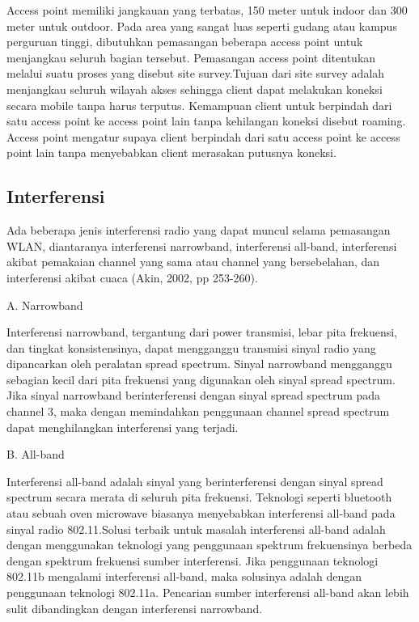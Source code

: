 \documentclass{jtetiproposalskripsi}
\begin{document}
	Access point memiliki jangkauan yang terbatas, 150 meter untuk indoor dan 300 meter untuk outdoor. Pada area yang sangat luas seperti gudang atau kampus perguruan tinggi, dibutuhkan pemasangan beberapa access point untuk menjangkau seluruh bagian tersebut. Pemasangan access point ditentukan melalui suatu proses yang disebut site survey.Tujuan dari site survey adalah menjangkau seluruh wilayah akses sehingga client dapat melakukan koneksi secara mobile tanpa harus terputus. Kemampuan client untuk berpindah dari satu access point ke access point lain tanpa kehilangan koneksi disebut roaming. Access point mengatur supaya client berpindah dari satu access point ke access point lain tanpa menyebabkan client merasakan putusnya koneksi.

\subsection{Interferensi}

	Ada beberapa jenis interferensi radio yang dapat muncul selama pemasangan WLAN, diantaranya interferensi narrowband, interferensi all-band, interferensi akibat pemakaian channel yang sama atau channel yang bersebelahan, dan interferensi akibat cuaca (Akin, 2002, pp 253-260).

A. Narrowband

	Interferensi narrowband, tergantung dari power transmisi, lebar pita frekuensi, dan tingkat konsistensinya, dapat mengganggu transmisi sinyal radio yang dipancarkan oleh peralatan spread spectrum. Sinyal narrowband mengganggu sebagian kecil dari pita frekuensi yang digunakan oleh sinyal spread spectrum. Jika sinyal narrowband berinterferensi dengan sinyal spread spectrum pada channel 3, maka dengan memindahkan penggunaan channel spread spectrum dapat menghilangkan interferensi yang terjadi. 

B. All-band

	Interferensi all-band adalah sinyal yang berinterferensi dengan sinyal spread spectrum secara merata di seluruh pita frekuensi. Teknologi seperti bluetooth atau sebuah oven microwave biasanya menyebabkan interferensi all-band pada sinyal radio 802.11.Solusi terbaik untuk masalah interferensi all-band adalah dengan menggunakan teknologi yang penggunaan spektrum frekuensinya berbeda dengan spektrum frekuensi sumber interferensi. Jika penggunaan teknologi 802.11b mengalami interferensi all-band, maka solusinya adalah dengan penggunaan teknologi 802.11a. Pencarian sumber interferensi all-band akan lebih sulit dibandingkan dengan interferensi narrowband.
\end{document}

